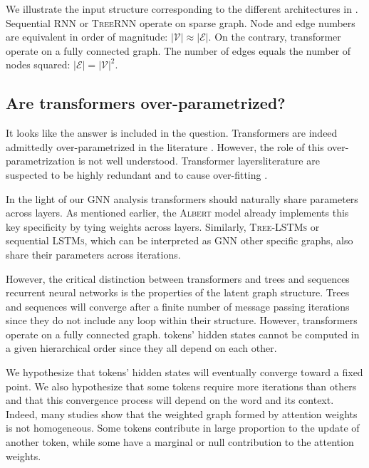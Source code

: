 We illustrate the input structure corresponding to the different architectures in .
Sequential \textsc{RNN} or \textsc{TreeRNN} operate on sparse graph. Node and edge numbers are equivalent in order of magnitude: $|\mathcal{V}| \approx |\mathcal{E}|$. On the contrary, transformer operate on a fully connected graph. The number of edges equals the number of nodes squared: $|\mathcal{E}| = |\mathcal{V}|^2$.

\subsection{Are transformers over-parametrized?}


It looks like the answer is included in the question. 
Transformers are indeed admittedly over-parametrized in the literature \parencite{chen_20, hou_20, voita_19}. 
However, the role of this over-parametrization is not well understood. 
Transformer layersliterature are suspected to be highly redundant \parencite{liu_20} and to cause over-fitting \parencite{fan_20, zhou_20b}. 

In the light of our GNN analysis transformers should naturally share parameters across layers. As mentioned earlier, the \textsc{Albert} model \parencite{lan_20} already implements this key specificity by tying weights across layers. Similarly, \textsc{Tree-LSTMs} or sequential \textsc{LSTMs}, which can be interpreted as GNN other specific graphs, also share their parameters across iterations.

However, the critical distinction between transformers and trees and sequences recurrent neural networks is the properties of the latent graph structure. Trees and sequences will converge after a finite number of message passing iterations since they do not include any loop within their structure. However, transformers operate on a fully connected graph. tokens’ hidden states cannot be computed in a given hierarchical order since they all depend on each other.

We hypothesize that tokens’ hidden states will eventually converge toward a fixed point. We also hypothesize that some tokens require more iterations than others and that this convergence process will depend on the word and its context. Indeed, many studies show that the weighted graph formed by attention weights is not homogeneous. Some tokens contribute in large proportion to the update of another token, while some have a marginal or null contribution to the attention weights.

